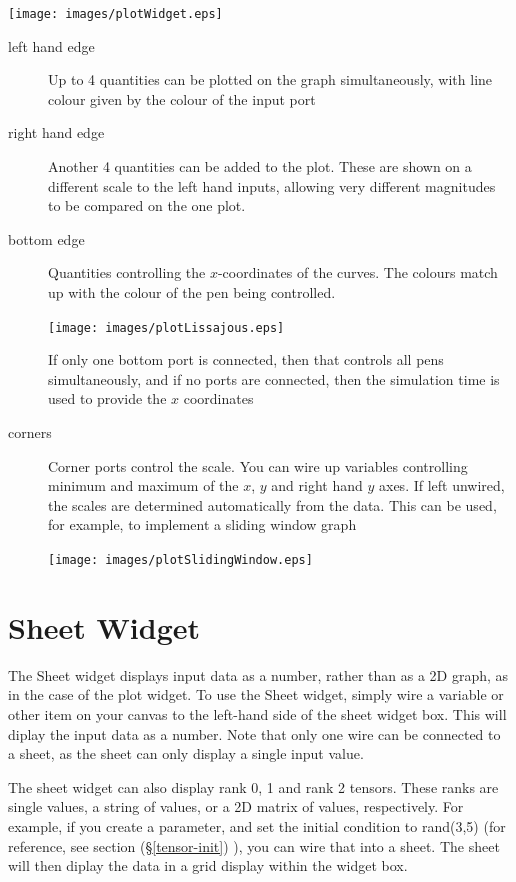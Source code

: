 \begin{center}
\texttt{[image: images/plotWidget.eps]}
\end{center}

\begin{description}
\item[left hand edge] Up to 4 quantities can be plotted on the graph
  simultaneously, with line colour given by the colour of the input
  port
\item[right hand edge] Another 4 quantities can be added to the
  plot. These are shown on a different scale to the left hand inputs,
  allowing very different magnitudes to be compared on the one plot.
\item[bottom edge] Quantities controlling the $x$-coordinates of the
  curves. The colours match up with the colour of the pen being
  controlled.

\begin{center}
\texttt{[image: images/plotLissajous.eps]}
\end{center}

  If only one bottom port is connected, then that controls all pens
  simultaneously, and if no ports are connected, then the simulation
  time is used to provide the $x$ coordinates
\item[corners] Corner ports control the scale. You can wire up
  variables controlling minimum and maximum of the $x$, $y$ and right hand
  $y$ axes. If left unwired, the scales are determined automatically
  from the data. This can be used, for example, to implement a sliding
  window graph

\begin{center}
\texttt{[image: images/plotSlidingWindow.eps]}
\end{center}
\end{description}

\section{Sheet Widget}
 \label{Sheets}\label{Item} The Sheet widget displays input data as a
 number, rather than as a 2D graph, as in the case of the plot widget.
 To use the Sheet widget, simply wire a variable or other item on your
 canvas to the left-hand side of the sheet widget box. This will diplay
 the input data as a number. Note that only one wire can be connected to
 a sheet, as the sheet can only display a single input value.
 
 The sheet widget can also display rank 0, 1 and rank 2 tensors. These ranks are
 single values, a string of values, or a 2D matrix of values, respectively.
 For example, if you create a parameter, and set the initial condition to rand(3,5)
 (for reference, see section (\S\ref{tensor-init}) ), you can wire that into a sheet.
 The sheet will then diplay the data in a grid display within the widget box.

